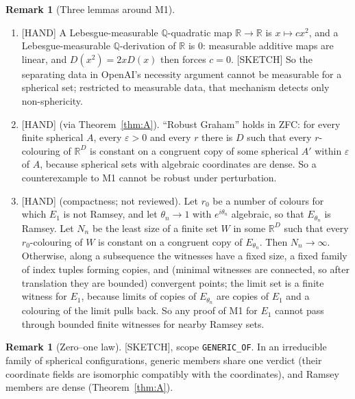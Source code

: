\documentclass[11pt]{amsart}
\newcommand{\st}[1]{\textsf{[#1]}}
\newcommand{\Q}{\mathbb{Q}}
\newcommand{\R}{\mathbb{R}}
\theoremstyle{plain}
\theoremstyle{definition}
\newtheorem{remark}[theorem]{Remark}
\begin{document}
\begin{remark}[Three lemmas around M1]\label{rem:M1lemmas}
\begin{enumerate}
\item[(L1)] \st{HAND} A Lebesgue-measurable $\Q$-quadratic map $\R\to\R$ is $x\mapsto cx^2$, and a
Lebesgue-measurable $\Q$-derivation of $\R$ is $0$: measurable additive maps are linear, and $D(x^2)=2xD(x)$
then forces $c=0$. \st{SKETCH} So the separating data in OpenAI's necessity argument \cite[\S2]{OAI172}
cannot be measurable for a spherical set; restricted to measurable data, that mechanism detects only
non-sphericity.
\item[(L3)] \st{HAND} (via Theorem~\ref{thm:A}). ``Robust Graham'' holds in ZFC: for every finite spherical
$A$, every $\varepsilon>0$ and every $r$ there is $D$ such that every $r$-colouring of $\R^D$ is constant on a
congruent copy of some spherical $A'$ within $\varepsilon$ of $A$, because spherical sets with algebraic
coordinates are dense. So a counterexample to M1 cannot be robust under perturbation.
\item[(L4)] \st{HAND} (compactness; not reviewed). Let $r_0$ be a number of colours for which $E_1$ is not
Ramsey, and let $\theta_n\to1$ with $e^{i\theta_n}$ algebraic, so that $E_{\theta_n}$ is Ramsey. Let $N_n$ be
the least size of a finite set $W$ in some $\R^D$ such that every $r_0$-colouring of $W$ is constant on a
congruent copy of $E_{\theta_n}$. Then $N_n\to\infty$. Otherwise, along a subsequence the witnesses have a
fixed size, a fixed family of index tuples forming copies, and (minimal witnesses are connected, so after
translation they are bounded) convergent points; the limit set is a finite witness for $E_1$, because
limits of copies of $E_{\theta_n}$ are copies of $E_1$ and a colouring of the limit pulls back. So any proof of
M1 for $E_1$ cannot pass through bounded finite witnesses for nearby Ramsey sets.
\end{enumerate}
\end{remark}

\begin{remark}[Zero--one law]
\st{SKETCH}, scope \texttt{GENERIC\_OF}. In an irreducible family of spherical configurations, generic
members share one verdict (their coordinate fields are isomorphic compatibly with the coordinates), and
Ramsey members are dense (Theorem~\ref{thm:A}).
\end{remark}
\end{document}
